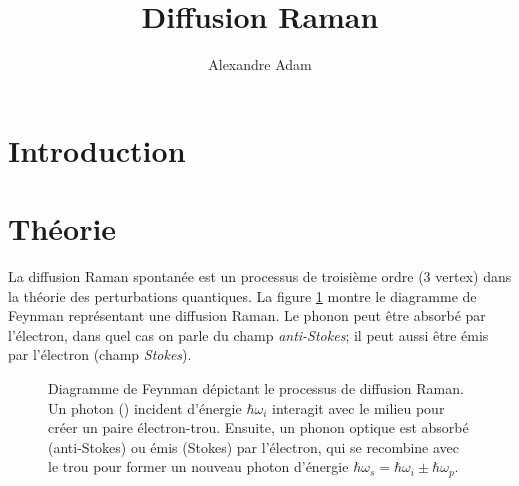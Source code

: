 \documentclass[10pt,letterpaper,twocolumn]{article}
\title{\vspace{-10mm}\Large
Diffusion Raman %
\vspace{-4mm}}
\author{\large
Alexandre Adam
}
\date{\vspace{-8mm}}
\begin{document}
\twocolumn[
\maketitle
\begin{onecolabstract} %

\vspace{4mm} %
\end{onecolabstract}
]

\section{Introduction}\label{intro} %


\section{Théorie}\label{sec:theorie} %
La diffusion Raman spontanée est un processus de troisième ordre (3 vertex) dans la théorie des perturbations quantiques\supercite{Yu2010}. La figure \ref{fig:FeynmanD} montre le diagramme de Feynman représentant une diffusion Raman. Le phonon peut être absorbé par l'électron, dans quel cas on parle du champ \textit{anti-Stokes}; il peut aussi être émis par l'électron (champ \textit{Stokes}). \par

\begin{figure}[H]
	\centering
	\caption{Diagramme de Feynman dépictant le processus de diffusion Raman. Un photon (\leadsto) incident d'énergie $\hbar \omega_i$ interagit avec le milieu pour créer un paire électron-trou. Ensuite, un phonon optique est absorbé (anti-Stokes) ou émis (Stokes) par l'électron, qui se recombine avec le trou pour former un nouveau photon d'énergie $\hbar \omega_s = \hbar \omega_i \pm \hbar \omega_p$. }
	\label{fig:FeynmanD}
\end{figure}
\end{document}
